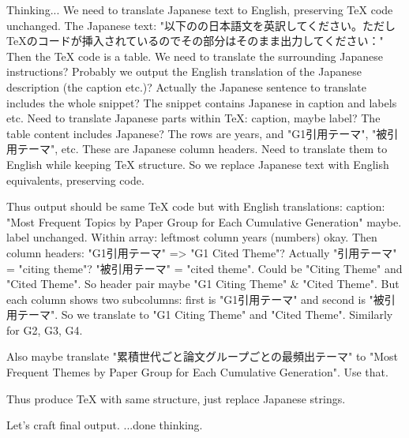 Thinking...
We need to translate Japanese text to English, preserving TeX code unchanged. The Japanese text: "以下のの日本語文を英訳してください。ただしTeXのコードが挿入されているのでその部分はそのまま出力してください：" Then the TeX code is a table. We need to translate the surrounding Japanese instructions? Probably we output the English translation of the Japanese description (the caption etc.)? Actually the Japanese sentence to translate includes the whole snippet? The snippet contains Japanese in caption and labels etc. Need to translate Japanese parts within TeX: caption, maybe label? The table content includes Japanese? The rows are years, and "G1引用テーマ", "被引用テーマ", etc. These are Japanese column headers. Need to translate them to English while keeping TeX structure. So we replace Japanese text with English equivalents, preserving code.

Thus output should be same TeX code but with English translations: caption: "Most Frequent Topics by Paper Group for Each Cumulative Generation" maybe. label unchanged. Within array: leftmost column years (numbers) okay. Then column headers: "G1引用テーマ" => "G1 Cited Theme"? Actually "引用テーマ" = "citing theme"? "被引用テーマ" = "cited theme". Could be "Citing Theme" and "Cited Theme". So header pair maybe "G1 Citing Theme" & "Cited Theme". But each column shows two subcolumns: first is "G1引用テーマ" and second is "被引用テーマ". So we translate to "G1 Citing Theme" and "Cited Theme". Similarly for G2, G3, G4.

Also maybe translate "累積世代ごと論文グループごとの最頻出テーマ" to "Most Frequent Themes by Paper Group for Each Cumulative Generation". Use that.

Thus produce TeX with same structure, just replace Japanese strings.

Let's craft final output.
...done thinking.

